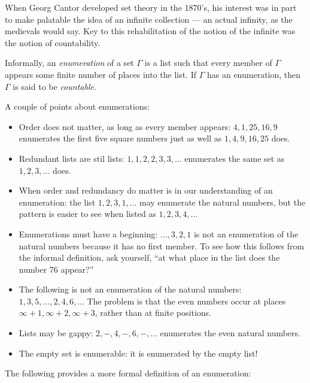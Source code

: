 \documentclass[../../include/open-logic-section]{subfiles}
\begin{document}

\begin{intro}
When Georg Cantor developed set theory in the 1870's, his 
interest was in part to make palatable the idea of an infinite 
collection --- an actual infinity, as the medievals would say. 
Key to this rehabilitation of the notion of the infinite was the 
notion of countability. 
\end{intro}

\begin{defn}
Informally, an \emph{enumeration} of a set $\Gamma$ is a list 
such that every member of $\Gamma$ appears some finite 
number of places into the list. If $\Gamma$ has an enumeration, 
then $\Gamma$ is said to be \emph{countable}.
\end{defn}

\begin{explain}
A couple of points about enumerations:

\begin{itemize}
\item Order does not matter, as long as every member appears: 
$4, 1, 25, 16,9$ enumerates the first five square numbers just 
as well as $1, 4, 9, 16, 25$ does.
\item Redundant lists are stil lists: $1, 1, 2, 2, 3, 3, \dots$ 
enumerates the same set as $1, 2, 3, \dots$ does.
\item When order and redundancy do matter is in our 
understanding of an enumeration: the list $1, 2, 3, 1, \dots$ may 
enumerate the natural numbers, but the pattern is easier to see 
when listed as $1, 2, 3, 4, \dots$
\item Enumerations must have a beginning: $\dots, 3, 2, 1$ is 
not an enumeration of the natural numbers because it has no 
first member. To see how this follows from the informal definition, 
ask yourself, ``at what place in the list does the number 76 
appear?''
\item The following is not an enumeration of the natural numbers: 
$1, 3, 5, \dots, 2, 4, 6, \dots$ The problem is that the even 
numbers occur at places $\infty + 1, \infty +2, \infty+3$, rather 
than at finite positions.
\item Lists may be gappy: $2, -, 4, -, 6, -, \dots$ enumerates the 
even natural numbers.
\item The empty set is enumerable: it is enumerated by the 
empty list!
\end{itemize}

The following provides a more formal definition of an 
enumeration:
\end{explain}
\end{document}
